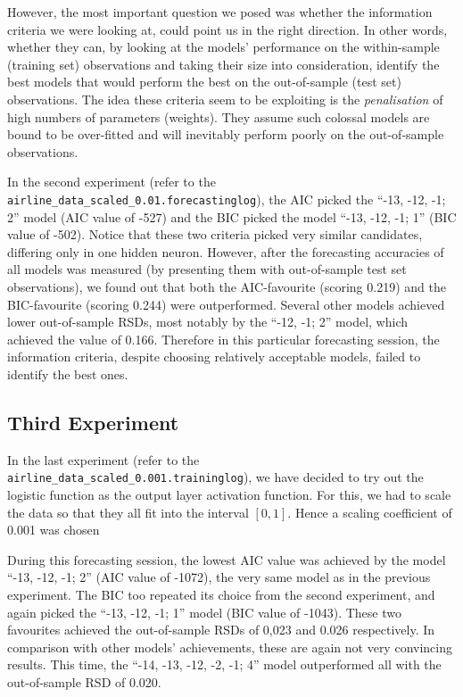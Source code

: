 However, the most important question we posed was whether the information criteria we were looking at, could point us in the right direction. In other words, whether they can, by looking at the models' performance on the within-sample (training set) observations and taking their size into consideration, identify the best models that would perform the best on the out-of-sample (test set) observations. The idea these criteria seem to be exploiting is the \textit{penalisation} of high numbers of parameters (weights). They assume such colossal models are bound to be over-fitted and will inevitably perform poorly on the out-of-sample observations.

In the second experiment (refer to the\\
\texttt{airline\_data\_scaled\_0.01.forecastinglog}), the AIC picked the  ``-13, -12, -1; 2'' model (AIC value of -527) and the BIC picked the model ``-13, -12, -1; 1'' (BIC value of -502). Notice that these two criteria picked very similar candidates, differing only in one hidden neuron. However, after the forecasting accuracies of all models was measured (by presenting them with out-of-sample test set observations), we found out that both the AIC-favourite (scoring 0.219) and the BIC-favourite (scoring 0.244) were outperformed.  Several other models achieved lower out-of-sample RSDs, most notably by the ``-12, -1; 2'' model, which achieved the value of 0.166. Therefore in this particular forecasting session, the information criteria, despite choosing relatively acceptable models, failed to identify the best ones.

\subsection{Third Experiment}

In the last experiment (refer to the\\
\texttt{airline\_data\_scaled\_0.001.traininglog}), we have decided to try out the logistic function as the output layer activation function. For this, we had to scale the data so that they all fit into the interval $[ 0, 1 ]$. Hence a scaling coefficient of 0.001 was chosen

 During this forecasting session, the lowest AIC value was achieved by the model ``-13, -12, -1; 2'' (AIC value of -1072), the very same model as in the previous experiment. The BIC too repeated its choice from the second experiment, and again picked the ``-13, -12, -1; 1'' model (BIC value of -1043). These two favourites achieved the out-of-sample RSDs of 0,023 and 0.026 respectively. In comparison with other models' achievements, these are again not very convincing results. This time, the ``-14, -13, -12, -2, -1; 4'' model outperformed all with the out-of-sample RSD of 0.020.
 
